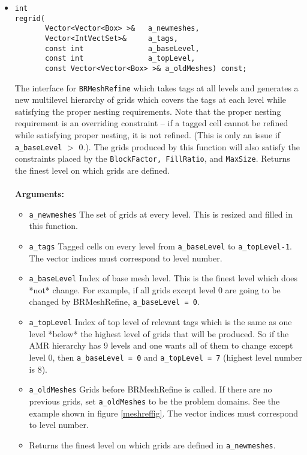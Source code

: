 \begin{itemize}
\item
\begin{verbatim}
int
regrid(
       Vector<Vector<Box> >&   a_newmeshes,
       Vector<IntVectSet>&     a_tags,    
       const int               a_baseLevel,    
       const int               a_topLevel,     
       const Vector<Vector<Box> >& a_oldMeshes) const;
\end{verbatim} 
The interface for {\tt BRMeshRefine} which takes 
tags at all levels and generates a new multilevel hierarchy of grids
which covers the tags at each level while satisfying the proper
nesting requirements.  Note that the proper nesting requirement is an
overriding constraint -- if a tagged cell cannot be refined while
satisfying proper nesting, it is not refined. (This is only an issue
if \verb/a_baseLevel/ $>$ 0.).  The grids produced by this function will also
satisfy the constraints placed by the {\tt BlockFactor, FillRatio}, and
{\tt MaxSize}. Returns the finest level on which grids are defined. \\
\\
{\bf Arguments:} 
\begin{itemize} 
\item \verb/a_newmeshes/ The set of grids at every level.  This is
resized and filled in this function.
\item  \verb/a_tags/ Tagged cells on every level from \verb/a_baseLevel/ to
        \verb/a_topLevel-1/.  The vector indices must correspond to
        level number.
\item  \verb/a_baseLevel/ Index of base mesh level.  This is the finest
        level which does *not* change.  For example, if all grids
        except level 0 are going to be changed  by BRMeshRefine,
        \verb/a_baseLevel = 0/.
\item  \verb/a_topLevel/ Index of top level of relevant tags which is the
        same as one level *below* the highest level of grids 
        that will be produced.  So if the AMR hierarchy has 9 levels and
        one wants all of them to change except level 0, then
        \verb/a_baseLevel = 0/ and \verb/a_topLevel = 7/ 
        (highest level number is 8).
\item  \verb/a_oldMeshes/ Grids before BRMeshRefine is called.  If there
        are no previous grids, set \verb/a_oldMeshes/ to be the
        problem domains.  See the example shown in figure \ref{meshreffig}.
        The vector indices must correspond to level number.
\item Returns the finest level on which grids are defined in
         \verb/a_newmeshes/.  
\end{itemize}        


\end{itemize}
